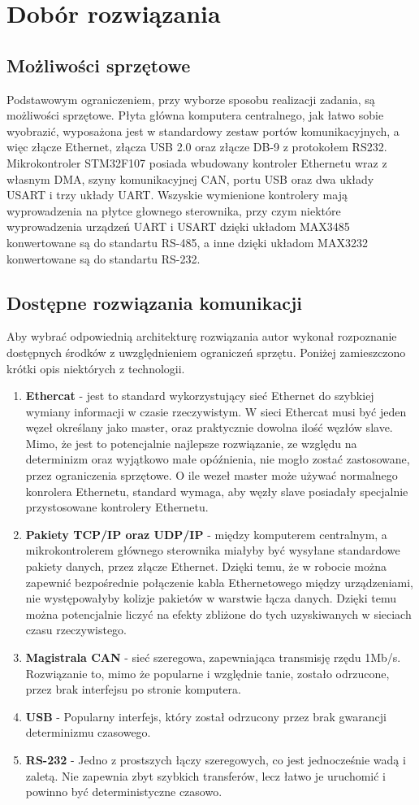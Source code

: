 \documentclass[10pt,a4paper]{article}
\begin{document}
	\section{Dobór rozwiązania}
	\subsection{Możliwości sprzętowe}
	Podstawowym ograniczeniem, przy wyborze sposobu realizacji zadania, są możliwości sprzętowe. Płyta główna komputera centralnego, jak łatwo sobie wyobrazić, wyposażona jest w standardowy zestaw portów komunikacyjnych, a więc złącze Ethernet, złącza USB 2.0 oraz złącze DB-9 z protokołem RS232. Mikrokontroler STM32F107 posiada wbudowany kontroler Ethernetu wraz z własnym DMA, szyny komunikacyjnej CAN, portu USB oraz dwa układy USART i trzy układy UART. Wszyskie wymienione kontrolery mają wyprowadzenia na płytce głownego sterownika, przy czym niektóre wyprowadzenia urządzeń UART i USART dzięki układom MAX3485 konwertowane są do standartu RS-485, a inne dzięki układom MAX3232 konwertowane są do standartu RS-232.
	\subsection{Dostępne rozwiązania komunikacji}
	Aby wybrać odpowiednią architekturę rozwiązania autor wykonał rozpoznanie dostępnych środków z uwzględnieniem ograniczeń sprzętu. Poniżej zamieszczono krótki opis niektórych z technologii.
	\begin{enumerate}
		\item \textbf{Ethercat} - jest to standard wykorzystujący sieć Ethernet do szybkiej wymiany informacji w czasie rzeczywistym. W sieci Ethercat musi być jeden węzeł określany jako master, oraz praktycznie dowolna ilość węzłów slave. Mimo, że jest to potencjalnie najlepsze rozwiązanie, ze względu na determinizm oraz wyjątkowo małe opóźnienia, nie mogło zostać zastosowane, przez ograniczenia sprzętowe. O ile wezeł master może używać normalnego konrolera Ethernetu, standard wymaga, aby węzły slave posiadały specjalnie przystosowane kontrolery Ethernetu.
		\item \textbf{Pakiety TCP/IP oraz UDP/IP} - między komputerem centralnym, a mikrokontrolerem głównego sterownika miałyby być wysyłane standardowe pakiety danych, przez złącze Ethernet. Dzięki temu, że w robocie można zapewnić bezpośrednie połączenie kabla Ethernetowego między urządzeniami, nie występowałyby kolizje pakietów w warstwie łącza danych. Dzięki temu można potencjalnie liczyć na efekty zbliżone do tych uzyskiwanych w sieciach czasu rzeczywistego.
		\item \textbf{Magistrala CAN} - sieć szeregowa, zapewniająca transmisję rzędu 1Mb/s. Rozwiązanie to, mimo że popularne i względnie tanie, zostało odrzucone, przez brak interfejsu po stronie komputera.
		\item \textbf{USB} - Popularny interfejs, który został odrzucony przez brak gwarancji determinizmu czasowego.
		\item \textbf{RS-232} - Jedno z prostszych łączy szeregowych, co jest jednocześnie wadą i zaletą. Nie zapewnia zbyt szybkich transferów, lecz łatwo je uruchomić i powinno być deterministyczne czasowo.
	\end{enumerate}
\end{document}
